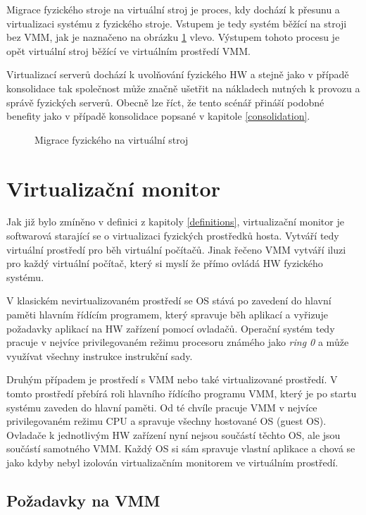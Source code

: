 Migrace fyzického stroje na virtuální stroj je proces, kdy dochází k přesunu a virtualizaci systému z fyzického stroje. Vstupem je tedy systém běžící na stroji bez VMM, jak je naznačeno na obrázku \ref{migration2} vlevo. 
Výstupem tohoto procesu je opět virtuální stroj běžící ve virtuálním prostředí VMM.

Virtualizací serverů dochází k uvolňování fyzického HW a stejně jako v případě konsolidace tak společnost může značně ušetřit na nákladech nutných k provozu a správě fyzických serverů. Obecně lze říct, že tento scénář přináší 
podobné benefity jako v případě konsolidace popsané v kapitole \ref{consolidation}.

\begin{figure}
    \centering    
    \caption{Migrace fyzického na virtuální stroj}
    \label{migration2}
\end{figure}

\section{Virtualizační monitor}
\label{section:vmm}

Jak již bylo zmíněno v definici z kapitoly \ref{definitions}, virtualizační monitor je softwarová starající se o virtualizaci fyzických prostředků hosta. Vytváří tedy virtuální prostředí pro běh virtuální počítačů.
Jinak řečeno VMM vytváří iluzi pro každý virtuální počítač, který si myslí že přímo ovládá HW fyzického systému.

V klasickém nevirtualizovaném prostředí se OS stává po zavedení do hlavní paměti hlavním řídícím programem, který spravuje běh aplikací a vyřizuje požadavky aplikací na HW zařízení pomocí ovladačů. Operační systém tedy pracuje
v nejvíce privilegovaném režimu procesoru známého jako \textit{ring 0} a může využívat všechny instrukce instrukční sady.

Druhým případem je prostředí s VMM nebo také virtualizované prostředí. V tomto prostředí přebírá roli hlavního řídícího programu VMM, který je po startu systému zaveden do hlavní paměti. Od té chvíle pracuje VMM v nejvíce privilegovaném
režimu CPU a spravuje všechny hostované OS (guest OS). Ovladače k jednotlivým HW zařízení nyní nejsou součástí těchto OS, ale jsou součástí samotného VMM. Každý OS si sám spravuje vlastní aplikace a chová se jako kdyby nebyl izolován virtualizačním monitorem
ve virtuálním prostředí.\cite{vmm1}

\subsection{Požadavky na VMM}

